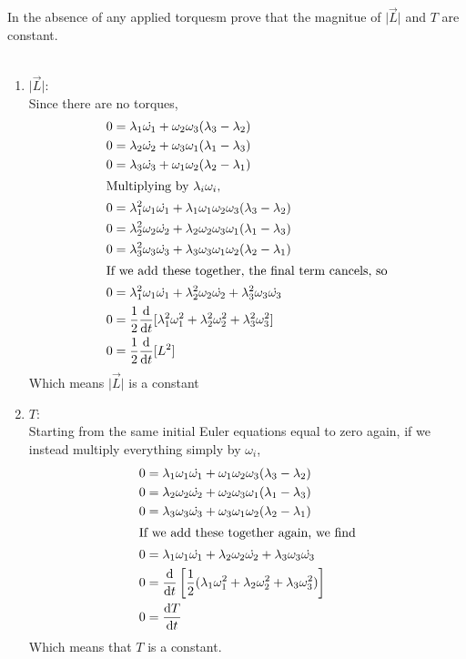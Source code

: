 \documentclass[a4paper]{article}
\begin{document}
\begin{eg}
In the absence of any applied torquesm prove that the magnitue of
$\lvert\vec{L}\rvert$ and $T$ are constant.\\~\\

\begin{enumerate}
	\item $\lvert\vec{L}\rvert$:\\
		Since there are no torques,
		\begin{align*}
			0 &= \lambda_1\dot{\omega_1}+
				\omega_2\omega_3(\lambda_3-\lambda_2)\\
			0 &= \lambda_2\dot{\omega_2}+
				\omega_3\omega_1(\lambda_1-\lambda_3)\\
			0 &= \lambda_3\dot{\omega_3}+
				\omega_1\omega_2(\lambda_2-\lambda_1)\\
		\shortintertext{Multiplying by $\lambda_i\omega_i$,}
			0 &= \lambda_1^2\omega_1\dot{\omega_1}+
				\lambda_1\omega_1
				\omega_2\omega_3(\lambda_3-\lambda_2)\\
			0 &= \lambda_2^2\omega_2\dot{\omega_2}+
				\lambda_2\omega_2
				\omega_3\omega_1(\lambda_1-\lambda_3)\\
			0 &= \lambda_3^2\omega_3\dot{\omega_3}+
				\lambda_3\omega_3
				\omega_1\omega_2(\lambda_2-\lambda_1)\\
		\shortintertext{If we add these together, the final term
		cancels, so}
			0 &= \lambda_1^2\omega_1\dot{\omega_1} +
			\lambda_2^2\omega_2\dot{\omega_2} +
			\lambda_3^2\omega_3\dot{\omega_3}\\
			0 &= \frac12 \frac{\mathrm{d} }{\mathrm{d} t}[\lambda_1^2\omega_1^2+
			\lambda_2^2\omega_2^2+\lambda_3^2\omega_3^2]\\
			0 &= \frac12 \frac{\mathrm{d} }{\mathrm{d} t}[L^2]
		\end{align*}
		Which means $\lvert\vec{L}\rvert$ is a constant
	\item $T$:\\
		Starting from the same initial Euler equations equal to
		zero again, if we instead multiply everything simply by
		$\omega_i$,
		\begin{align*}
			0 &= \lambda_1\omega_1\dot{\omega_1}+
				\omega_1
				\omega_2\omega_3(\lambda_3-\lambda_2)\\
			0 &= \lambda_2\omega_2\dot{\omega_2}+
				\omega_2
				\omega_3\omega_1(\lambda_1-\lambda_3)\\
			0 &= \lambda_3\omega_3\dot{\omega_3}+
				\omega_3
				\omega_1\omega_2(\lambda_2-\lambda_1)\\
		\shortintertext{If we add these together again, we find}
			0 &= \lambda_1\omega_1\dot{\omega_1}
				+ \lambda_2\omega_2\dot{\omega_2}
				+ \lambda_3\omega_3\dot{\omega_3}\\
			0 &= \frac{\mathrm{d} }{\mathrm{d} t}\left[\frac12(\lambda_1\omega_1^2
				+ \lambda_2\omega_2^2+\lambda_3\omega_3^2)
				\right]\\
			0 &= \frac{\mathrm{d} T}{\mathrm{d} t}
		\end{align*}
		Which means that $T$ is a constant.
\end{enumerate}
\end{eg}
\end{document}

